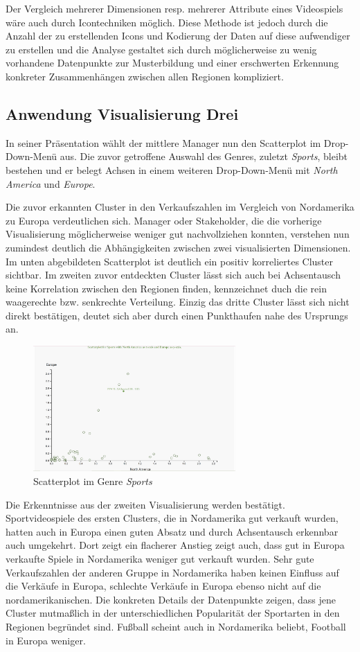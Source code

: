 \documentclass[usegeometry=true]{scrartcl}
\begin{document}
Der Vergleich mehrerer Dimensionen resp. mehrerer Attribute eines Videospiels wäre auch durch Icontechniken möglich. 
Diese Methode ist jedoch durch die Anzahl der zu erstellenden Icons und Kodierung der Daten auf diese aufwendiger zu erstellen und die Analyse
gestaltet sich durch möglicherweise zu wenig vorhandene Datenpunkte zur Musterbildung und einer erschwerten Erkennung konkreter Zusammenhängen zwischen allen Regionen kompliziert.

\subsection{Anwendung Visualisierung Drei}
In seiner Präsentation wählt der mittlere Manager nun den Scatterplot im Drop-Down-Menü aus.
Die zuvor getroffene Auswahl des Genres, zuletzt \textit{Sports}, bleibt bestehen und 
er belegt Achsen in einem weiteren Drop-Down-Menü mit \textit{North America} und \textit{Europe}.

Die zuvor erkannten Cluster in den Verkaufszahlen im Vergleich von Nordamerika zu Europa verdeutlichen sich. 
Manager oder Stakeholder, die die vorherige Visualisierung möglicherweise weniger gut nachvollziehen konnten, verstehen nun zumindest deutlich die Abhängigkeiten zwischen zwei visualisierten Dimensionen. 
Im unten abgebildeten Scatterplot ist deutlich ein positiv korreliertes Cluster sichtbar. 
Im zweiten zuvor entdeckten Cluster lässt sich auch bei Achsentausch keine Korrelation zwischen den Regionen finden, kennzeichnet duch die rein waagerechte bzw. senkrechte Verteilung.
Einzig das dritte Cluster lässt sich nicht direkt bestätigen, deutet sich aber durch einen Punkthaufen nahe des Ursprungs an.
\begin{figure}[h]
        \centering
        \includegraphics[height=4.8cm]{Bilder/Scatterplot_Sports.png}
        \caption{Scatterplot im Genre \textit{Sports}}
        \label{fig:ScatterplotSports}
\end{figure}
Die Erkenntnisse aus der zweiten Visualisierung werden bestätigt. 
Sportvideospiele des ersten Clusters, die in Nordamerika gut verkauft wurden, hatten auch in Europa einen guten Absatz und durch Achsentausch erkennbar auch umgekehrt.
Dort zeigt ein flacherer Anstieg zeigt auch, dass gut in Europa verkaufte Spiele in Nordamerika weniger gut verkauft wurden. 
Sehr gute Verkaufszahlen der anderen Gruppe in Nordamerika haben keinen Einfluss auf die Verkäufe in Europa, schlechte Verkäufe in Europa ebenso nicht auf die nordamerikanischen. 
Die konkreten Details der Datenpunkte zeigen, dass jene Cluster mutmaßlich in der unterschiedlichen Popularität der Sportarten in den Regionen begründet sind. 
Fußball scheint auch in Nordamerika beliebt, Football in Europa weniger.
\end{document}
